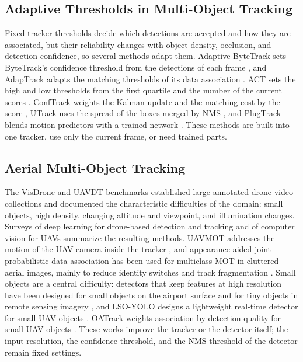 \subsection{Adaptive Thresholds in Multi-Object Tracking}
Fixed tracker thresholds decide which detections are accepted and how they are associated, but their reliability changes with object density, occlusion, and detection confidence, so several methods adapt them. Adaptive ByteTrack sets ByteTrack's confidence threshold from the detections of each frame \cite{ma2023adaptivebytetrack}, and AdapTrack adapts the matching thresholds of its data association \cite{shim2024adaptrack}. ACT sets the high and low thresholds from the first quartile and the number of the current scores \cite{act2026adaptive}. ConfTrack weights the Kalman update and the matching cost by the score \cite{jung2024conftrack}, UTrack uses the spread of the boxes merged by NMS \cite{solano2025utrack}, and PlugTrack blends motion predictors with a trained network \cite{kim2026plugtrack}. These methods are built into one tracker, use only the current frame, or need trained parts.

\subsection{Aerial Multi-Object Tracking}
The VisDrone \cite{zhu2022visdrone} and UAVDT \cite{du2018uavdt} benchmarks established large annotated drone video collections and documented the characteristic difficulties of the domain: small objects, high density, changing altitude and viewpoint, and illumination changes. Surveys of deep learning for drone-based detection and tracking \cite{wu2022uavsurvey} and of computer vision for UAVs \cite{kanellakis2017uavvision} summarize the resulting methods. UAVMOT addresses the motion of the UAV camera inside the tracker \cite{liu2022uavmot}, and appearance-aided joint probabilistic data association has been used for multiclass MOT in cluttered aerial images, mainly to reduce identity switches and track fragmentation \cite{kim2024afjpda}. Small objects are a central difficulty: detectors that keep features at high resolution have been designed for small objects on the airport surface \cite{huang2022airportsmall} and for tiny objects in remote sensing imagery \cite{fathy2026toren}, and LSO-YOLO designs a lightweight real-time detector for small UAV objects \cite{dai2026lsoyolo}. OATrack weights association by detection quality for small UAV objects \cite{qi2026oatrack}. These works improve the tracker or the detector itself; the input resolution, the confidence threshold, and the NMS threshold of the detector remain fixed settings.

